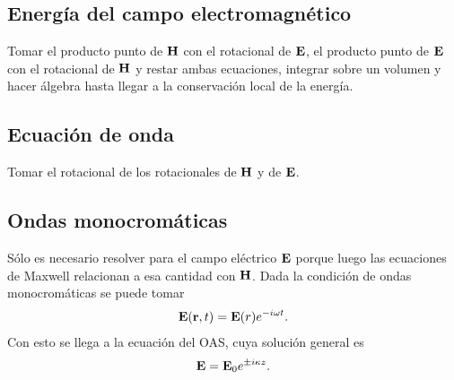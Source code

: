 \subsection{Energía del campo electromagnético}
Tomar el producto punto de $\vb{H}$ con el rotacional de $\vb{E}$,
el producto punto de $\vb{E}$ con el rotacional de $\vb{H}$ y 
restar ambas ecuaciones, integrar sobre un volumen y hacer álgebra 
hasta llegar a la conservación local de la energía.

\subsection{Ecuación de onda}
Tomar el rotacional de los rotacionales de $\vb{H}$ y de $\vb{E}$. 

\subsection{Ondas monocromáticas}
Sólo es necesario resolver para el campo eléctrico $\vb{E}$ porque
luego las ecuaciones de Maxwell relacionan a esa cantidad con $\vb{H}$.
Dada la condición de ondas monocromáticas se puede tomar 
\begin{align}
\vb{E}(\vb{r},t)=\vb{E}(r)e^{-i\omega t}.
\end{align}
Con esto se llega a la ecuación del OAS, cuya solución general es 
\begin{align}
\vb{E}=\vb{E}_0e^{\pm i\kappa z}.
\end{align}
